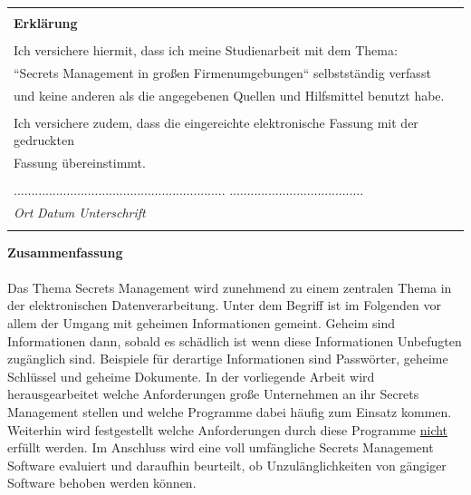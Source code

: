 \documentclass[
book,
a4paper,   
titlepage,  
halfparskip,
12pt        
]{scrartcl}
\begin{document}
\thispagestyle{empty}

\begin{table}[h]
\centering
  \begin{tabular}{| l |}
  \hline
  \\
  \textbf{Erklärung} \\
  \\
  Ich versichere hiermit, dass ich meine Studienarbeit mit dem Thema: \\
  ``Secrets Management in großen Firmenumgebungen`` selbstständig verfasst \\
  und keine anderen als die angegebenen Quellen und Hilfsmittel benutzt habe. \\
  \\
  Ich versichere zudem, dass die eingereichte elektronische Fassung mit der gedruckten \\
  Fassung übereinstimmt. \\ \\
  ............................................................\hspace{0.5cm} ......................................\\
  \textit{Ort} \hspace{1cm} \textit{Datum} \hspace{4.2cm} \textit{Unterschrift}\\
  \\
  \hline
  \end{tabular}
\end{table}
\newpage

\thispagestyle{empty}

\large{\textbf{Zusammenfassung}}\\
\\
Das Thema Secrets Management wird zunehmend zu einem zentralen Thema in der
elektronischen Datenverarbeitung.  Unter dem Begriff ist im Folgenden vor
allem der Umgang mit geheimen Informationen gemeint.  Geheim sind
Informationen dann, sobald es schädlich ist wenn diese Informationen
Unbefugten zugänglich sind. Beispiele für derartige Informationen sind
Passwörter, geheime Schlüssel und geheime Dokumente. In der vorliegende Arbeit
wird herausgearbeitet welche Anforderungen große Unternehmen
an ihr Secrets Management stellen und welche Programme dabei häufig zum
Einsatz kommen. Weiterhin wird festgestellt welche
Anforderungen durch diese Programme \underline{nicht} erfüllt werden. Im Anschluss
wird eine voll umfängliche Secrets Management Software evaluiert und daraufhin beurteilt, 
ob Unzulänglichkeiten von gängiger Software behoben
werden können. 
\end{document}
